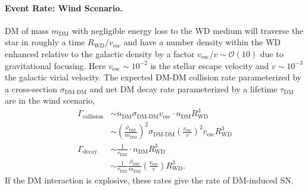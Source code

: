 \documentclass[twocolumn, preprintnumbers,amsmath,amssymb,prd, superscriptaddress]{revtex4}
\newcommand{\OO}{\mathcal{O}}
\def\r{\right)}
\def\l{\left(}
\begin{document}
\paragraph{Event Rate: Wind Scenario.}
DM of mass $m_\text{DM}$ with negligible energy loss to the WD medium will traverse the star in roughly a time $R_\text{WD}/v_\text{esc}$ and have a number density within the WD enhanced relative to the galactic density by a factor $v_\text{esc}/v \sim \OO(10)$ due to gravitational focusing.
Here $v_\text{esc} \sim 10^{-2} $ is the stellar escape velocity and $v \sim 10^{-3}$ the galactic virial velocity.
The expected DM-DM collision rate parameterized by a cross-section $\sigma_\text{DM-DM}$ and net DM decay rate parameterized by a lifetime $\tau_\text{DM}$ are in the wind scenario,
\begin{align}
  \Gamma_\text{collision}
  &\sim n_\text{DM} \sigma_\text{DM-DM} v_\text{esc}
  \cdot n_\text{DM} R_\text{WD}^3 \\
  &\sim \l \frac{\rho_\text{DM}}{m_\text{DM}} \r^2 \sigma_\text{DM-DM} \l \frac{v_\text{esc}}{v}\r^2 v_\text{esc} R_\text{WD}^3 \\
  \label{eq:collisionDM}
  \Gamma_\text{decay}
  &\sim \frac{1}{\tau_\text{DM}} \cdot n_\text{DM} R_\text{WD}^3 \\
  &\sim \frac{1}{\tau_\text{DM}} \frac{\rho_{\text{DM}}}{m_\text{DM}} \l \frac{v_\text{esc}}{v}\r R_\text{WD}^3.
  \label{eq:taugamma}
\end{align}
If the DM interaction is explosive, these rates give the rate of DM-induced SN.
\end{document}
